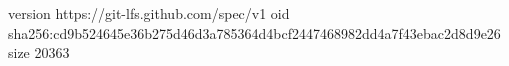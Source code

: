 version https://git-lfs.github.com/spec/v1
oid sha256:cd9b524645e36b275d46d3a785364d4bcf2447468982dd4a7f43ebac2d8d9e26
size 20363
